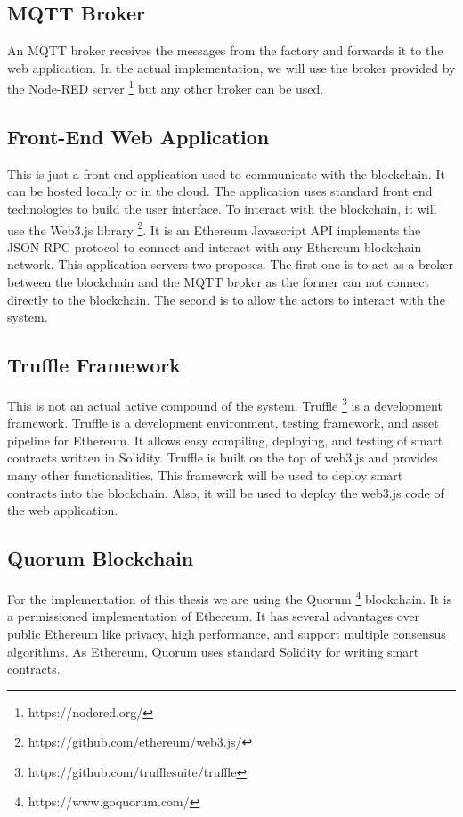 \documentclass[runningheads]{llncs}
\begin{document}
\subsection{MQTT Broker}
An MQTT broker receives the messages from the factory and forwards it to the web application. In the actual implementation, we will use the broker provided by the Node-RED server \footnote{https://nodered.org/} but any other broker can be used.

\subsection{Front-End Web Application}
This is just a front end application used to communicate with the blockchain. It can be hosted locally or in the cloud. The application uses standard front end technologies to build the user interface. To interact with the blockchain, it will use the Web3.js library \footnote{https://github.com/ethereum/web3.js/}. It is an Ethereum Javascript API implements the JSON-RPC protocol to connect and interact with any Ethereum blockchain network. This application servers two proposes. The first one is to act as a broker between the blockchain and the MQTT broker as the former can not connect directly to the blockchain. The second is to allow the actors to interact with the system. 


\subsection{Truffle Framework}
This is not an actual active compound of the system. Truffle \footnote{https://github.com/trufflesuite/truffle} is a development framework. Truffle is a development environment, testing framework, and asset pipeline for Ethereum. It allows easy compiling, deploying, and testing of smart contracts written in Solidity. Truffle is built on the top of web3.js and provides many other functionalities. This framework will be used to deploy smart contracts into the blockchain. Also, it will be used to deploy the web3.js code of the web application. 


\subsection{Quorum Blockchain}
For the implementation of this thesis we are using the Quorum \footnote{https://www.goquorum.com/} blockchain. It is a permissioned implementation of Ethereum. It has several advantages over public Ethereum like privacy, high performance, and support multiple consensus algorithms. As Ethereum, Quorum uses standard Solidity for writing smart contracts.
\end{document}

